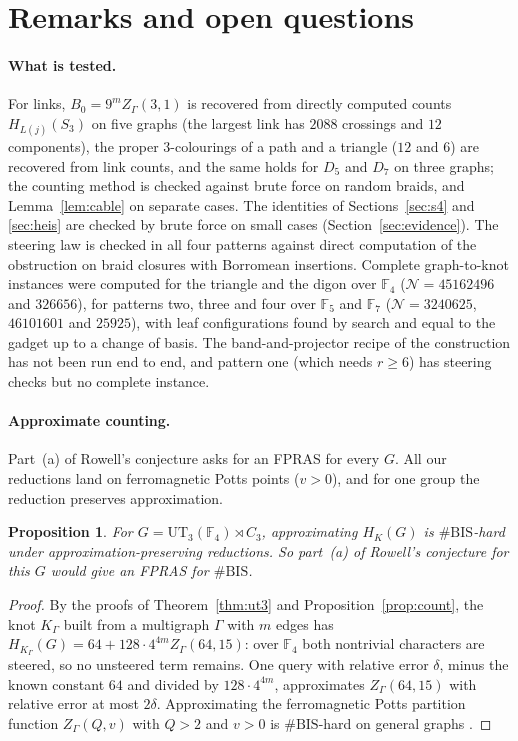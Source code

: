 \documentclass[11pt]{article}
\newtheorem{proposition}[theorem]{Proposition}
\theoremstyle{definition}
\theoremstyle{remark}
\newcommand{\F}{\mathbb{F}}
\newcommand{\cN}{\mathcal{N}}
\begin{document}
\section{Remarks and open questions}\label{sec:remarks}

\paragraph{What is tested.} For links, $B_0=9^mZ_\Gamma(3,1)$ is recovered from
directly computed counts $H_{L(j)}(S_3)$ on five graphs (the largest link has
$2088$ crossings and $12$ components), the proper $3$-colourings of a path and a
triangle ($12$ and $6$) are recovered from link counts, and the same holds for
$D_5$ and $D_7$ on three graphs; the counting method is checked against brute
force on random braids, and Lemma~\ref{lem:cable} on separate cases. The
identities of Sections~\ref{sec:s4} and \ref{sec:heis} are checked by brute
force on small cases (Section~\ref{sec:evidence}).
The steering law is checked in all four patterns against direct computation of
the obstruction on braid closures with Borromean insertions. Complete
graph-to-knot instances were computed for the triangle and the digon over
$\F_4$ ($\cN=45162496$ and $326656$), for patterns two, three and four over
$\F_5$ and $\F_7$ ($\cN=3240625$, $46101601$ and $25925$), with leaf
configurations found by search and equal to the gadget up to a change of
basis. The band-and-projector recipe of the construction has not been run end
to end, and pattern one (which needs $r\ge6$) has steering checks but no
complete instance.

\paragraph{Approximate counting.} Part~(a) of Rowell's conjecture asks for an
FPRAS for every $G$. All our reductions land on ferromagnetic Potts points
($v>0$), and for one group the reduction preserves approximation.

\begin{proposition}\label{prop:bis}
For $G=\mathrm{UT}_3(\F_4)\rtimes C_3$, approximating $H_K(G)$ is
$\#\mathrm{BIS}$-hard under approximation-preserving reductions. So part~(a)
of Rowell's conjecture for this $G$ would give an FPRAS for $\#\mathrm{BIS}$.
\end{proposition}

\begin{proof}
By the proofs of Theorem~\ref{thm:ut3} and Proposition~\ref{prop:count}, the knot
$K_\Gamma$ built from a multigraph $\Gamma$ with $m$ edges has
$H_{K_\Gamma}(G)=64+128\cdot4^{4m}Z_\Gamma(64,15)$: over $\F_4$ both nontrivial
characters are steered, so no unsteered term remains. One query with relative
error $\delta$, minus the known constant $64$ and divided by $128\cdot4^{4m}$,
approximates $Z_\Gamma(64,15)$ with relative error at most $2\delta$. Approximating
the ferromagnetic Potts partition function $Z_\Gamma(Q,v)$ with $Q>2$ and
$v>0$ is $\#\mathrm{BIS}$-hard on general graphs \cite[Thm.~1]{GJ12}.
\end{proof}
\end{document}
